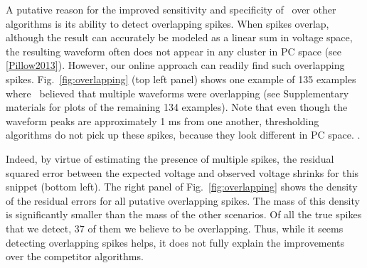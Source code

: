 A putative reason for the improved sensitivity and specificity of \smug\ over other algorithms is its ability to detect overlapping spikes.   When spikes overlap, although the result can accurately be modeled as a linear sum in voltage space, the resulting waveform often does not appear in any cluster in PC space (see \ref{Pillow2013}).  However, our online approach can readily find such overlapping spikes.  Fig.\ \ref{fig:overlapping} (top left panel) shows one example of 135 examples where \smug\ believed that multiple waveforms were overlapping (see Supplementary materials for plots of the remaining 134 examples).  
Note that even though the waveform peaks are approximately 1 ms from one another, thresholding algorithms do not pick up these spikes, because they look different in PC space. .

Indeed, by virtue of estimating the presence of multiple spikes, the residual squared error between the expected voltage and observed voltage shrinks for this snippet (bottom left).  The right panel of Fig.\ \ref{fig:overlapping} shows the density of the residual errors for all putative overlapping spikes.  The mass of this density is significantly smaller than the mass of the other scenarios.  Of all the true spikes that we detect, 37 of them we believe to be overlapping.  Thus, while it seems detecting overlapping spikes helps, it does not fully explain the improvements over the competitor algorithms.




